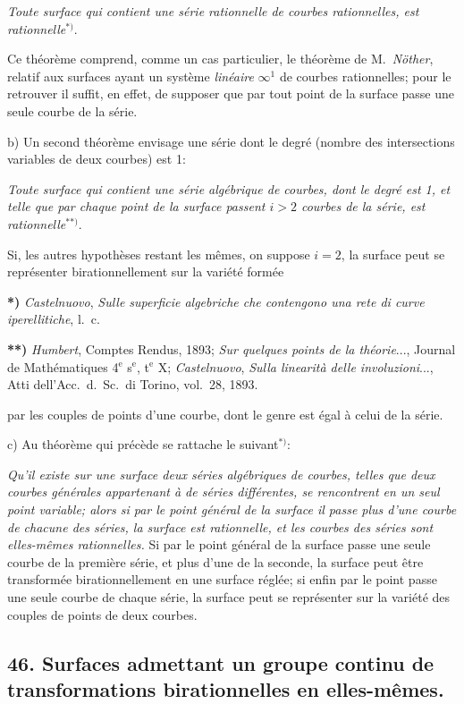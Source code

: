 \documentclass{article}
\begin{document}
\emph{Toute surface qui contient une série rationnelle de courbes rationnelles, est rationnelle}${}^{*)}$.

Ce théorème comprend, comme un cas particulier, le théorème de M.\ \emph{Nöther}, relatif aux surfaces ayant un système \emph{linéaire} $\infty^{1}$ de courbes rationnelles; pour le retrouver il suffit, en effet, de supposer que par tout point de la surface passe une seule courbe de la série.

b) Un second théorème envisage une série dont le degré (nombre des intersections variables de deux courbes) est 1:

\emph{Toute surface qui contient une série algébrique de courbes, dont le degré est 1, et telle que par chaque point de la surface passent $i > 2$ courbes de la série, est rationnelle}${}^{**)}$.

Si, les autres hypothèses restant les mêmes, on suppose $i = 2$, la surface peut se représenter birationnellement sur la variété formée

\textbf{*)} \emph{Castelnuovo}, \emph{Sulle superficie algebriche che contengono una rete di curve iperellitiche}, l.\ c.

\textbf{**)} \emph{Humbert}, Comptes Rendus, 1893; \emph{Sur quelques points de la théorie}..., Journal de Mathématiques 4${}^{\text{e}}$ s${}^{\text{e}}$, t${}^{\text{e}}$ X; \emph{Castelnuovo}, \emph{Sulla linearità delle involuzioni}..., Atti dell'Acc.\ d.\ Sc.\ di Torino, vol.\ 28, 1893.

par les couples de points d'une courbe, dont le genre est égal à celui de la série.

c) Au théorème qui précède se rattache le suivant${}^{*)}$:

\emph{Qu'il existe sur une surface deux séries algébriques de courbes, telles que deux courbes générales appartenant à de séries différentes, se rencontrent en un seul point variable; alors si par le point général de la surface il passe plus d'une courbe de chacune des séries, la surface est rationnelle, et les courbes des séries sont elles-mêmes rationnelles.} Si par le point général de la surface passe une seule courbe de la première série, et plus d'une de la seconde, la surface peut être transformée birationnellement en une surface réglée; si enfin par le point passe une seule courbe de chaque série, la surface peut se représenter sur la variété des couples de points de deux courbes.

\subsection*{46. Surfaces admettant un groupe continu de transformations birationnelles en elles-mêmes.}
\end{document}
